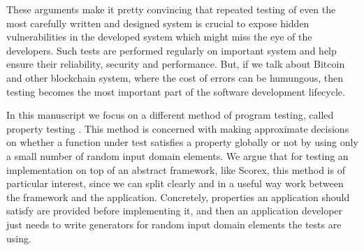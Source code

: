 These arguments make it pretty convincing that repeated testing of even the most carefully written and designed system is crucial to expose hidden vulnerabilities in the developed system which might miss the eye of the developers. Such tests are performed regularly on important system and help ensure their reliability, security and performance. But, if we talk about Bitcoin and other blockchain system, where the cost of errors can be humungous, then testing becomes the most important part of the software development lifecycle.

In this manuscript we focus on a different method of program testing, called property testing \cite{ron2001property}. This method is concerned with making approximate decisions on whether a function under test satisfies a property globally or not by using only a small number of random input domain elements. We argue that for testing an implementation on top of an abstract framework, like Scorex, this method is of particular interest, since we can split clearly and in a useful way work between the framework and the application. Concretely, properties an application should satisfy are provided before implementing it, and then an application developer just needs to write generators for random input domain elements the tests are using.
\nocite{holzmann1995improvement}
\nocite{zaki2008formal}




